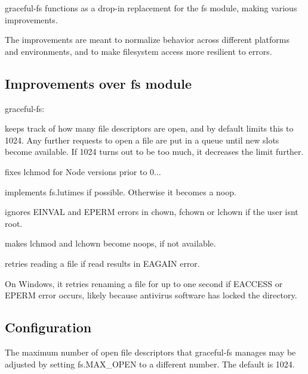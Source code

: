 graceful-\/fs functions as a drop-\/in replacement for the fs module, making various improvements.

The improvements are meant to normalize behavior across different platforms and environments, and to make filesystem access more resilient to errors.

\subsection*{Improvements over fs module}

graceful-\/fs\+:


\begin{DoxyItemize}
\item keeps track of how many file descriptors are open, and by default limits this to 1024. Any further requests to open a file are put in a queue until new slots become available. If 1024 turns out to be too much, it decreases the limit further.
\item fixes {\ttfamily lchmod} for Node versions prior to 0...
\item implements {\ttfamily fs.\+lutimes} if possible. Otherwise it becomes a noop.
\item ignores {\ttfamily E\+I\+N\+V\+AL} and {\ttfamily E\+P\+E\+RM} errors in {\ttfamily chown}, {\ttfamily fchown} or {\ttfamily lchown} if the user isn\textquotesingle{}t root.
\item makes {\ttfamily lchmod} and {\ttfamily lchown} become noops, if not available.
\item retries reading a file if {\ttfamily read} results in E\+A\+G\+A\+IN error.
\end{DoxyItemize}

On Windows, it retries renaming a file for up to one second if {\ttfamily E\+A\+C\+C\+E\+SS} or {\ttfamily E\+P\+E\+RM} error occurs, likely because antivirus software has locked the directory.

\subsection*{Configuration}

The maximum number of open file descriptors that graceful-\/fs manages may be adjusted by setting {\ttfamily fs.\+M\+A\+X\+\_\+\+O\+P\+EN} to a different number. The default is 1024. 